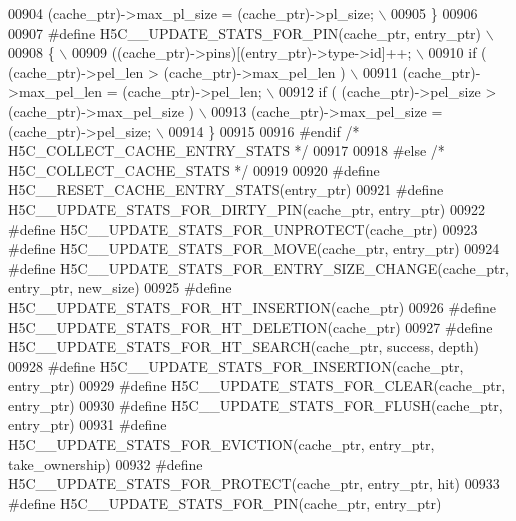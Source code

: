 \begin{DoxyCode}
00904 \textcolor{preprocessor}{        (cache\_ptr)->max\_pl\_size = (cache\_ptr)->pl\_size;                    \(\backslash\)}
00905 \textcolor{preprocessor}{\}}
00906 
00907 \textcolor{preprocessor}{#define H5C\_\_UPDATE\_STATS\_FOR\_PIN(cache\_ptr, entry\_ptr)      \(\backslash\)}
00908 \textcolor{preprocessor}{\{                                                            \(\backslash\)}
00909 \textcolor{preprocessor}{    ((cache\_ptr)->pins)[(entry\_ptr)->type->id]++;            \(\backslash\)}
00910 \textcolor{preprocessor}{    if ( (cache\_ptr)->pel\_len > (cache\_ptr)->max\_pel\_len )   \(\backslash\)}
00911 \textcolor{preprocessor}{        (cache\_ptr)->max\_pel\_len = (cache\_ptr)->pel\_len;     \(\backslash\)}
00912 \textcolor{preprocessor}{    if ( (cache\_ptr)->pel\_size > (cache\_ptr)->max\_pel\_size ) \(\backslash\)}
00913 \textcolor{preprocessor}{        (cache\_ptr)->max\_pel\_size = (cache\_ptr)->pel\_size;   \(\backslash\)}
00914 \textcolor{preprocessor}{\}}
00915 
00916 \textcolor{preprocessor}{#endif }\textcolor{comment}{/* H5C\_COLLECT\_CACHE\_ENTRY\_STATS */}\textcolor{preprocessor}{}
00917 
00918 \textcolor{preprocessor}{#else }\textcolor{comment}{/* H5C\_COLLECT\_CACHE\_STATS */}\textcolor{preprocessor}{}
00919 
00920 \textcolor{preprocessor}{#define H5C\_\_RESET\_CACHE\_ENTRY\_STATS(entry\_ptr)}
00921 \textcolor{preprocessor}{#define H5C\_\_UPDATE\_STATS\_FOR\_DIRTY\_PIN(cache\_ptr, entry\_ptr)}
00922 \textcolor{preprocessor}{#define H5C\_\_UPDATE\_STATS\_FOR\_UNPROTECT(cache\_ptr)}
00923 \textcolor{preprocessor}{#define H5C\_\_UPDATE\_STATS\_FOR\_MOVE(cache\_ptr, entry\_ptr)}
00924 \textcolor{preprocessor}{#define H5C\_\_UPDATE\_STATS\_FOR\_ENTRY\_SIZE\_CHANGE(cache\_ptr, entry\_ptr, new\_size)}
00925 \textcolor{preprocessor}{#define H5C\_\_UPDATE\_STATS\_FOR\_HT\_INSERTION(cache\_ptr)}
00926 \textcolor{preprocessor}{#define H5C\_\_UPDATE\_STATS\_FOR\_HT\_DELETION(cache\_ptr)}
00927 \textcolor{preprocessor}{#define H5C\_\_UPDATE\_STATS\_FOR\_HT\_SEARCH(cache\_ptr, success, depth)}
00928 \textcolor{preprocessor}{#define H5C\_\_UPDATE\_STATS\_FOR\_INSERTION(cache\_ptr, entry\_ptr)}
00929 \textcolor{preprocessor}{#define H5C\_\_UPDATE\_STATS\_FOR\_CLEAR(cache\_ptr, entry\_ptr)}
00930 \textcolor{preprocessor}{#define H5C\_\_UPDATE\_STATS\_FOR\_FLUSH(cache\_ptr, entry\_ptr)}
00931 \textcolor{preprocessor}{#define H5C\_\_UPDATE\_STATS\_FOR\_EVICTION(cache\_ptr, entry\_ptr, take\_ownership)}
00932 \textcolor{preprocessor}{#define H5C\_\_UPDATE\_STATS\_FOR\_PROTECT(cache\_ptr, entry\_ptr, hit)}
00933 \textcolor{preprocessor}{#define H5C\_\_UPDATE\_STATS\_FOR\_PIN(cache\_ptr, entry\_ptr)}

\end{DoxyCode}
